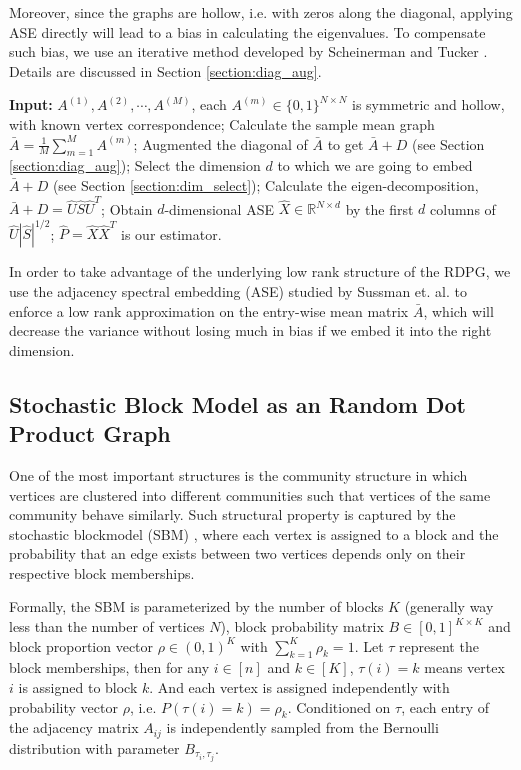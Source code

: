 \documentclass[a4paper]{article}
\begin{document}
Moreover, since the graphs are hollow, i.e. with zeros along the diagonal, applying ASE directly will lead to a bias in calculating the eigenvalues. To compensate such bias, we use an iterative method developed by Scheinerman and Tucker \cite{scheinerman2010modeling}. Details are discussed in Section \ref{section:diag_aug}.


\begin{algorithm}[H]
\caption{}
\label{algo:basic}
\begin{algorithmic}[1]
\STATE \textbf{Input:} $A^{(1)}, A^{(2)}, \cdots, A^{(M)}$, each $A^{(m)} \in \{0,1\}^{N \times N}$ is symmetric and hollow, with known vertex correspondence;
\STATE Calculate the sample mean graph $\bar{A} = \frac{1}{M}\sum\limits_{m = 1}^M A^{(m)}$;
\STATE Augmented the diagonal of $\bar{A}$ to get $\bar{A} + D$ (see Section \ref{section:diag_aug});
\STATE Select the dimension $d$ to which we are going to embed $\bar{A} + D$ (see Section \ref{section:dim_select});
\STATE Calculate the eigen-decomposition, $\bar{A} + D = \hat{U} \hat{S} \hat{U}^T$;
\STATE Obtain $d$-dimensional ASE $\hat{X} \in \mathbb{R}^{N \times d}$ by the first $d$ columns of $\hat{U} |\hat{S}|^{1/2}$;
\STATE $\hat{P} = \hat{X} \hat{X}^{T}$ is our estimator.
\end{algorithmic}
\end{algorithm}



In order to take advantage of the underlying low rank structure of the RDPG, we use the adjacency spectral embedding (ASE) studied by Sussman et. al. to enforce a low rank approximation on the entry-wise mean matrix $\bar{A}$, which will decrease the variance without losing much in bias if we embed it into the right dimension.

\subsection{Stochastic Block Model as an Random Dot Product Graph}
\label{section:sbm_rdpg}
One of the most important structures is the community structure in which vertices are clustered into different communities such that vertices of the same community behave similarly. Such structural property is captured by the stochastic blockmodel (SBM) \cite{holland1983stochastic}, where each vertex is assigned to a block and the probability that an edge exists between two vertices depends only on their respective block memberships.

Formally, the SBM is parameterized by the number of blocks $K$ (generally way less than the number of vertices $N$), block probability matrix $B \in [0,1]^{K \times K}$ and block proportion vector $\rho \in (0,1)^K$ with $\sum_{k=1}^K \rho_k = 1$. Let $\tau$ represent the block memberships, then for any $i \in [n]$ and $k \in [K]$, $\tau(i) = k$ means vertex $i$ is assigned to block $k$. And each vertex is assigned independently with probability vector $\rho$, i.e. $P(\tau(i) = k) = \rho_k$. Conditioned on $\tau$, each entry of the adjacency matrix $A_{ij}$ is independently sampled from the Bernoulli distribution with parameter $B_{\tau_i,\tau_j}$.
\end{document}
